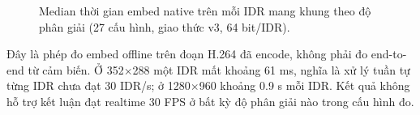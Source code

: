 \documentclass[11pt,a4paper]{article}
\renewcommand{\_}{\origunderscore\allowbreak}
\begin{document}
\begin{figure}[H]\centering
{}
\caption{Median thời gian embed native trên mỗi IDR mang khung theo độ phân giải (27 cấu hình, giao thức v3, 64 bit/IDR).}
\label{fig:fps-resolution}
\end{figure}
Đây là phép đo embed offline trên đoạn H.264 đã encode, không phải đo end-to-end từ cảm biến. Ở 352$\times$288 một IDR mất khoảng 61 ms, nghĩa là xử lý tuần tự từng IDR chưa đạt 30 IDR/s; ở 1280$\times$960 khoảng 0.9 s mỗi IDR. Kết quả không hỗ trợ kết luận đạt realtime 30 FPS ở bất kỳ độ phân giải nào trong cấu hình đo.
\end{document}
